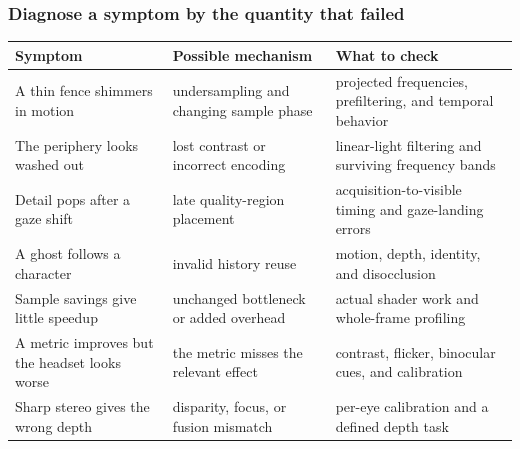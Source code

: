 \subsubsection{Diagnose a symptom by the quantity that failed}\label{04-visual-computing-ii-ch043-diagnose-a-symptom-by-the-quantity-that-failed}

\hypertarget{04-visual-computing-ii-ch043-diagnose-a-symptom-by-the-quantity-that-failed}{}

{\def\LTcaptype{none} %
\begin{longtable}[]{@{}
  >{\raggedright\arraybackslash}p{}
  >{\raggedright\arraybackslash}p{}
  >{\raggedright\arraybackslash}p{}@{}}
\toprule\noalign{}
\begin{minipage}[b]{\linewidth}\raggedright
Symptom
\end{minipage} & \begin{minipage}[b]{\linewidth}\raggedright
Possible mechanism
\end{minipage} & \begin{minipage}[b]{\linewidth}\raggedright
What to check
\end{minipage} \\
\midrule\noalign{}
\endhead
\bottomrule\noalign{}
\endlastfoot
A thin fence shimmers in motion & undersampling and changing sample phase & projected frequencies, prefiltering, and temporal behavior \\
The periphery looks washed out & lost contrast or incorrect encoding & linear-light filtering and surviving frequency bands \\
Detail pops after a gaze shift & late quality-region placement & acquisition-to-visible timing and gaze-landing errors \\
A ghost follows a character & invalid history reuse & motion, depth, identity, and disocclusion \\
Sample savings give little speedup & unchanged bottleneck or added overhead & actual shader work and whole-frame profiling \\
A metric improves but the headset looks worse & the metric misses the relevant effect & contrast, flicker, binocular cues, and calibration \\
Sharp stereo gives the wrong depth & disparity, focus, or fusion mismatch & per-eye calibration and a defined depth task \\
\end{longtable}
}

